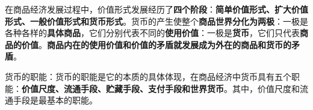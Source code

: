 在商品经济发展过程中，价值形式发展经历了\textbf{四个阶段}：\textbf{简单价值形式、扩大价值形式、一般价值形式和货币形式}。货币的产生使整个\textbf{商品世界分化为两极}：一极是各种各样的\textbf{具体商品}，它们分别代表不同的\textbf{使用价值}：一极是\textbf{货币}，它们只代表\textbf{商品的价值}。\textbf{商品内在的使用价值和价值的矛盾就发展成为外在的商品和货币的矛盾}。

{货币的职能：货币的职能是它的本质的具体体现，在商品经济中货币具有五个职能：}\textbf{价值尺度、流通手段、贮藏手段、支付手段和世界货币}{。其中，价值尺度和流通手段是最基本的职能。}
